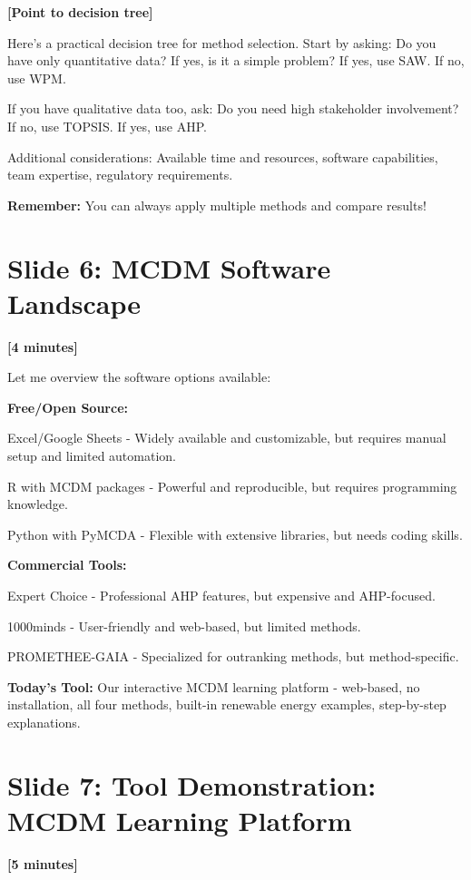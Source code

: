 \documentclass[12pt]{article}
\begin{document}
\textcolor{speakernote}{\textbf{[Point to decision tree]}}

Here's a practical decision tree for method selection. Start by asking: Do you have only quantitative data? If yes, is it a simple problem? If yes, use SAW. If no, use WPM.

If you have qualitative data too, ask: Do you need high stakeholder involvement? If no, use TOPSIS. If yes, use AHP.

Additional considerations: Available time and resources, software capabilities, team expertise, regulatory requirements.

\textcolor{emphasis}{\textbf{Remember:}} You can always apply multiple methods and compare results!

\section*{Slide 6: MCDM Software Landscape}
\textcolor{timing}{\textbf{[4 minutes]}}

Let me overview the software options available:

\textcolor{emphasis}{\textbf{Free/Open Source:}}

Excel/Google Sheets - Widely available and customizable, but requires manual setup and limited automation.

R with MCDM packages - Powerful and reproducible, but requires programming knowledge.

Python with PyMCDA - Flexible with extensive libraries, but needs coding skills.

\textcolor{emphasis}{\textbf{Commercial Tools:}}

Expert Choice - Professional AHP features, but expensive and AHP-focused.

1000minds - User-friendly and web-based, but limited methods.

PROMETHEE-GAIA - Specialized for outranking methods, but method-specific.

\textcolor{emphasis}{\textbf{Today's Tool:}} Our interactive MCDM learning platform - web-based, no installation, all four methods, built-in renewable energy examples, step-by-step explanations.

\section*{Slide 7: Tool Demonstration: MCDM Learning Platform}
\textcolor{timing}{\textbf{[5 minutes]}}
\end{document}
